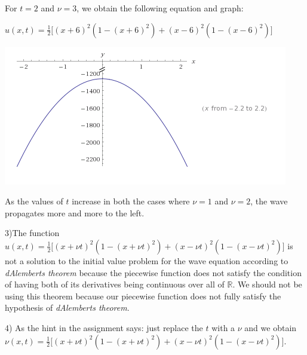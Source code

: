 \documentclass[executivepaper]{article}
\begin{document}
\begin{flushleft}
\vspace{3mm}

For $t=2$ and $\nu=3$, we obtain the following equation and graph:

\vspace{3mm}

$u(x,t)=\frac{1}{2} \bigg[(x+6)^2(1-(x+6)^2)+(x-6)^2(1-(x-6)^2)\bigg]$

\vspace{3mm}

\includegraphics[scale=0.5]{TEqualToThreeAndVEqualToTwo}

\vspace{3mm}

As the values of $t$ increase in both the cases where $\nu=1$ and $\nu=2$, the wave propagates more and more to the left.

\end{flushleft}

\begin{flushleft}

3)The function $u(x,t)=\frac{1}{2} \bigg[(x+\nu t)^2(1-(x+\nu t)^2)+(x-\nu t)^2(1-(x-\nu t)^2)\bigg]$ is not a solution to the initial value problem for the wave equation according to \textit{d\textsc{}Alembert\textsc{}s theorem} because the piecewise function does not satisfy the condition of having both of its derivatives being continuous over all of $\mathbb{R}$. We should not be using this theorem because our piecewise function does not fully satisfy the hypothesis of \textit{d\textsc{}Alembert\textsc{}s theorem}.

\end{flushleft}

\vspace{3mm}

\begin{flushleft}

4) As the hint in the assignment says: just replace the $t$ with a $\nu$ and we obtain $\nu(x,t)=\frac{1}{2} \bigg[(x+\nu t)^2(1-(x+\nu t)^2)+(x-\nu t)^2(1-(x-\nu t)^2)\bigg]$.

\end{flushleft}
\end{document}
